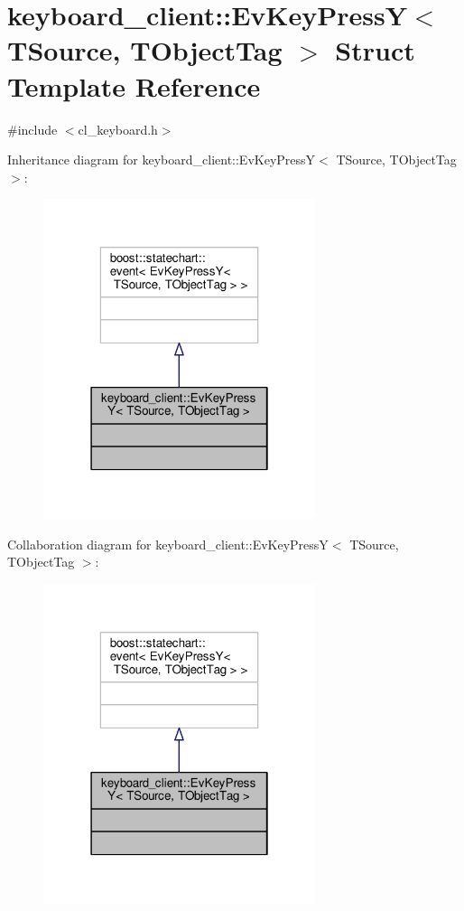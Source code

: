 \hypertarget{structkeyboard__client_1_1EvKeyPressY}{}\section{keyboard\+\_\+client\+:\+:Ev\+Key\+PressY$<$ T\+Source, T\+Object\+Tag $>$ Struct Template Reference}
\label{structkeyboard__client_1_1EvKeyPressY}


{\ttfamily \#include $<$cl\+\_\+keyboard.\+h$>$}



Inheritance diagram for keyboard\+\_\+client\+:\+:Ev\+Key\+PressY$<$ T\+Source, T\+Object\+Tag $>$\+:\nopagebreak
\begin{figure}[H]
\begin{center}
\leavevmode
\includegraphics[width=226pt]{structkeyboard__client_1_1EvKeyPressY__inherit__graph}
\end{center}
\end{figure}


Collaboration diagram for keyboard\+\_\+client\+:\+:Ev\+Key\+PressY$<$ T\+Source, T\+Object\+Tag $>$\+:\nopagebreak
\begin{figure}[H]
\begin{center}
\leavevmode
\includegraphics[width=226pt]{structkeyboard__client_1_1EvKeyPressY__coll__graph}
\end{center}
\end{figure}


